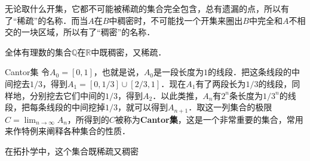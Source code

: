 无论取什么开集，它都不可能被稀疏的集合完全包含，总有遗漏的点，所以有了“稀疏”的名称．而当$A$在$B$中稠密时，不可能找一个开集来圈出$B$中完全和$A$不相交的一块区域，所以有了“稠密”的名称．

全体有理数的集合$\mathbb{Q}$在$\mathbb{R}$中既稠密，又稀疏．

\begin{example}{Cantor集}\label{Topo0_ex2}
令$A_0=[0,1]$，也就是说，$A_0$是一段长度为$1$的线段．把这条线段的中间挖去$1/3$，得到$A_1=[0,1/3]\cup[2/3,1]$．现在$A_1$有了两段长为$1/3$的线段，同样地，分别挖去它们中间的$1/3$，得到$A_2$．以此类推，$A_n$有$2^n$条长度为$1/3^n$的线段，把每条线段的中间挖掉$1/3$，就可以得到$A_{n+1}$．取这一列集合的极限$C=\lim_{n\rightarrow\infty}A_n$，所得到的$C$被称为\textbf{Cantor集}，这是一个非常重要的集合，常用来作特例来阐释各种集合的性质．

在拓扑学中，这个集合既稀疏又稠密
\end{example}
